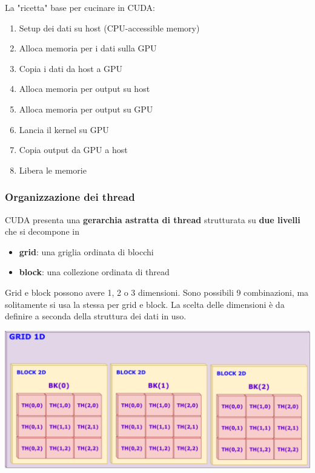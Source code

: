 \newpage

La "ricetta" base per cucinare in CUDA:
\begin{enumerate}
	\item Setup dei dati su host (CPU-accessible memory)
	
	\item Alloca memoria per i dati sulla GPU
	
	\item Copia i dati da host a GPU
	
	\item Alloca memoria per output su host
	
	\item Alloca memoria per output su GPU
	
	\item Lancia il kernel su GPU
	
	\item Copia output da GPU a host
	
	\item Libera le memorie
\end{enumerate}

\subsubsection{Organizzazione dei thread}

CUDA presenta una \textbf{gerarchia astratta di thread} strutturata su \textbf{due livelli} che si decompone in 
\begin{itemize}
	\item \textbf{grid}: una griglia ordinata di blocchi

	\item \textbf{block}: una collezione ordinata di thread
\end{itemize}

Grid e block possono avere 1, 2 o 3 dimensioni. Sono possibili 9 combinazioni, ma solitamente si usa la stessa per grid e block. La scelta delle dimensioni è da definire a seconda della struttura dei dati in uso.
\begin{center}
	\includegraphics[width=0.98\linewidth]{img/cuda/grdiblock}
\end{center}

